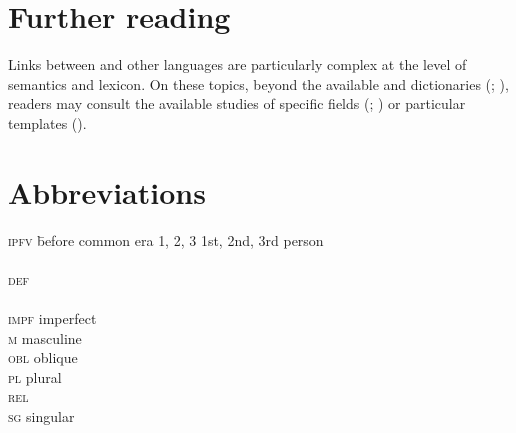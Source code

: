 \documentclass[output=paper]{langsci/langscibook}
\begin{document}
\section*{Further reading}

Links between  and other languages are particularly complex at the level of semantics and lexicon. On these topics, beyond the available  and  dictionaries (\citealt{Heath2004}; \citealt{Taine-Cheikh1988dictionary,Taine-Cheikh2008dictionary}), readers may consult the available studies of specific fields (\citealt{Monteil1952}; \citealt{Taine-Cheikh2013}) or particular templates (\citealt{Taine-Cheikh2018quadri}).

\section*{Abbreviations}
\begin{multicols}{2}
\begin{tabbing}
\textsc{ipfv} \hspace{1em} \= before common era\kill
\textsc{1, 2, 3} \> 1st, 2nd, 3rd person \\
           \>   \\
\textsc{def}     \>  \\
           \>   \\
\textsc{impf}   \> imperfect \\
\textsc{m}   \> masculine\\
\textsc{obl} \> oblique \\
\textsc{pl}  \> plural\\
\textsc{rel}     \> \\
\textsc{sg}  \> singular \\
 \> 
\end{tabbing}
\end{multicols}



\sloppy
\printbibliography[heading=subbibliography,notkeyword=this]
\end{document}
